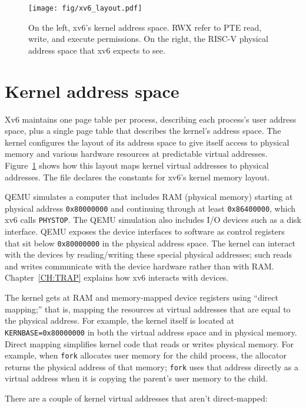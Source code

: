 \begin{figure}[h]
\centering
 \texttt{[image: fig/xv6\_layout.pdf]}
\caption{On the left, xv6's kernel address space.
{\sf \small{RWX}}
refer to PTE read, write, and execute permissions.
On the right, the RISC-V physical address space that
xv6 expects to see.}
\label{fig:xv6_layout}
\end{figure}

\section{Kernel address space}
Xv6 maintains one page table per process, describing each
process's user address space, plus a single page table
that describes the kernel's address space.
The kernel configures the layout of its address space to
give itself
access to physical memory and
various hardware resources at predictable virtual addresses.
Figure~\ref{fig:xv6_layout}
shows how this layout maps
kernel virtual addresses to physical addresses.  The file
declares the constants for xv6's kernel memory layout.

QEMU simulates a computer that includes RAM (physical memory) starting
at physical address \texttt{0x80000000} and continuing through
at least \texttt{0x86400000}, which xv6 calls \texttt{PHYSTOP}.
The QEMU simulation also
includes I/O devices
such as a disk interface.
QEMU exposes the device interfaces to software as
control registers that sit below
\texttt{0x80000000}
in the physical address space.
The kernel can interact with the devices by reading/writing
these special physical addresses; such reads and writes communicate
with the device hardware rather than with RAM.
Chapter~\ref{CH:TRAP} explains
how xv6 interacts with devices.

The kernel gets at RAM and memory-mapped device registers
using ``direct mapping;'' that is, mapping the resources at
virtual addresses that are equal to the physical address.
For
example, the kernel itself is located at \lstinline{KERNBASE=0x80000000} in both
the virtual address space and in physical memory.
Direct mapping simplifies kernel code that reads or writes
physical memory. For example, when \lstinline{fork}
allocates user memory for the child process,
the allocator returns the physical address of that memory;
\lstinline{fork} uses that address directly as a virtual
address when it is copying the parent's user memory to the child.

There are a couple of kernel virtual
addresses that aren't direct-mapped:

